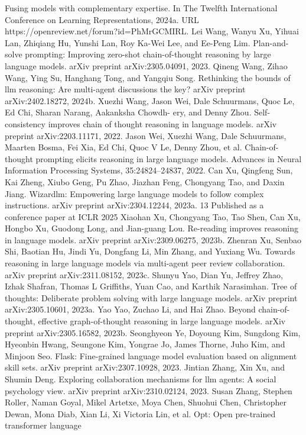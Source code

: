 Fusing models with complementary expertise. In The Twelfth International Conference on Learning
Representations, 2024a. URL https://openreview.net/forum?id=PhMrGCMIRL.
Lei Wang, Wanyu Xu, Yihuai Lan, Zhiqiang Hu, Yunshi Lan, Roy Ka-Wei Lee, and Ee-Peng Lim.
Plan-and-solve prompting: Improving zero-shot chain-of-thought reasoning by large language
models. arXiv preprint arXiv:2305.04091, 2023.
Qineng Wang, Zihao Wang, Ying Su, Hanghang Tong, and Yangqiu Song. Rethinking the bounds of
llm reasoning: Are multi-agent discussions the key? arXiv preprint arXiv:2402.18272, 2024b.
Xuezhi Wang, Jason Wei, Dale Schuurmans, Quoc Le, Ed Chi, Sharan Narang, Aakanksha Chowdh-
ery, and Denny Zhou. Self-consistency improves chain of thought reasoning in language models.
arXiv preprint arXiv:2203.11171, 2022.
Jason Wei, Xuezhi Wang, Dale Schuurmans, Maarten Bosma, Fei Xia, Ed Chi, Quoc V Le, Denny
Zhou, et al. Chain-of-thought prompting elicits reasoning in large language models. Advances in
Neural Information Processing Systems, 35:24824–24837, 2022.
Can Xu, Qingfeng Sun, Kai Zheng, Xiubo Geng, Pu Zhao, Jiazhan Feng, Chongyang Tao, and Daxin
Jiang. Wizardlm: Empowering large language models to follow complex instructions. arXiv
preprint arXiv:2304.12244, 2023a.
13
Published as a conference paper at ICLR 2025
Xiaohan Xu, Chongyang Tao, Tao Shen, Can Xu, Hongbo Xu, Guodong Long, and Jian-guang Lou.
Re-reading improves reasoning in language models. arXiv preprint arXiv:2309.06275, 2023b.
Zhenran Xu, Senbao Shi, Baotian Hu, Jindi Yu, Dongfang Li, Min Zhang, and Yuxiang Wu. Towards
reasoning in large language models via multi-agent peer review collaboration. arXiv preprint
arXiv:2311.08152, 2023c.
Shunyu Yao, Dian Yu, Jeffrey Zhao, Izhak Shafran, Thomas L Griffiths, Yuan Cao, and Karthik
Narasimhan. Tree of thoughts: Deliberate problem solving with large language models. arXiv
preprint arXiv:2305.10601, 2023a.
Yao Yao, Zuchao Li, and Hai Zhao. Beyond chain-of-thought, effective graph-of-thought reasoning
in large language models. arXiv preprint arXiv:2305.16582, 2023b.
Seonghyeon Ye, Doyoung Kim, Sungdong Kim, Hyeonbin Hwang, Seungone Kim, Yongrae Jo,
James Thorne, Juho Kim, and Minjoon Seo. Flask: Fine-grained language model evaluation based
on alignment skill sets. arXiv preprint arXiv:2307.10928, 2023.
Jintian Zhang, Xin Xu, and Shumin Deng. Exploring collaboration mechanisms for llm agents: A
social psychology view. arXiv preprint arXiv:2310.02124, 2023.
Susan Zhang, Stephen Roller, Naman Goyal, Mikel Artetxe, Moya Chen, Shuohui Chen, Christopher
Dewan, Mona Diab, Xian Li, Xi Victoria Lin, et al. Opt: Open pre-trained transformer language
